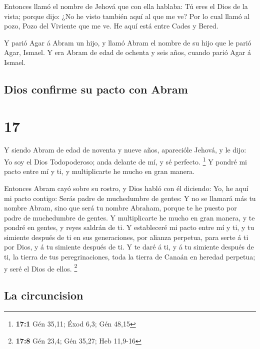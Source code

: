  Entonces llamó el nombre de Jehová que con ella hablaba:
Tú eres el Dios de la vista; porque dijo: ¿No he visto también aquí al
que me ve?  Por lo cual llamó al pozo, Pozo del Viviente
que me ve. He aquí está entre Cades y Bered.

 Y parió Agar á Abram un hijo, y llamó Abram el nombre de
su hijo que le parió Agar, Ismael.  Y era Abram de edad
de ochenta y seis años, cuando parió Agar á Ismael.

\hypertarget{dios-confirme-su-pacto-con-abram}{%
\subsection{Dios confirme su pacto con
Abram}\label{dios-confirme-su-pacto-con-abram}}

\hypertarget{section-16}{%
\section{17}\label{section-16}}

 Y siendo Abram de edad de noventa y nueve años,
aparecióle Jehová, y le dijo: Yo soy el Dios Todopoderoso; anda delante
de mí, y sé perfecto. \footnote{\textbf{17:1} Gén 35,11; Éxod 6,3; Gén
  48,15}  Y pondré mi pacto entre mí y ti, y multiplicarte
he mucho en gran manera.

 Entonces Abram cayó sobre su rostro, y Dios habló con él
diciendo:  Yo, he aquí mi pacto contigo: Serás padre de
muchedumbre de gentes:  Y no se llamará más tu nombre
Abram, sino que será tu nombre Abraham, porque te he puesto por padre de
muchedumbre de gentes.  Y multiplicarte he mucho en gran
manera, y te pondré en gentes, y reyes saldrán de ti.  Y
estableceré mi pacto entre mí y ti, y tu simiente después de ti en sus
generaciones, por alianza perpetua, para serte á ti por Dios, y á tu
simiente después de ti.  Y te daré á ti, y á tu simiente
después de ti, la tierra de tus peregrinaciones, toda la tierra de
Canaán en heredad perpetua; y seré el Dios de ellos. \footnote{\textbf{17:8}
  Gén 23,4; Gén 35,27; Heb 11,9-16}

\hypertarget{la-circuncision}{%
\subsection{La circuncision}\label{la-circuncision}}

